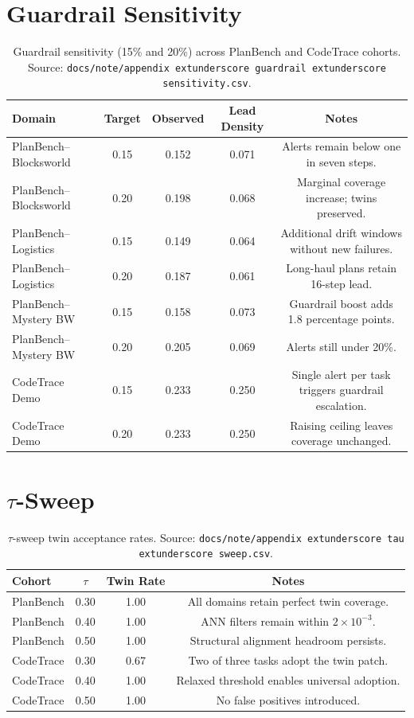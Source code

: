 \documentclass[11pt]{article}
\begin{document}
\section{Guardrail Sensitivity}
\label{app:guardrail}
\begin{table}[h]
  \centering
  \caption{Guardrail sensitivity (15\% and 20\%) across PlanBench and CodeTrace cohorts. Source: \texttt{docs/note/appendix	extunderscore guardrail	extunderscore sensitivity.csv}.}
  \begin{tabular}{lcccc}
    \toprule
    Domain & Target & Observed & Lead Density & Notes \\
    \midrule
    PlanBench--Blocksworld & 0.15 & 0.152 & 0.071 & Alerts remain below one in seven steps. \\
    PlanBench--Blocksworld & 0.20 & 0.198 & 0.068 & Marginal coverage increase; twins preserved. \\
    PlanBench--Logistics & 0.15 & 0.149 & 0.064 & Additional drift windows without new failures. \\
    PlanBench--Logistics & 0.20 & 0.187 & 0.061 & Long-haul plans retain 16-step lead. \\
    PlanBench--Mystery BW & 0.15 & 0.158 & 0.073 & Guardrail boost adds 1.8 percentage points. \\
    PlanBench--Mystery BW & 0.20 & 0.205 & 0.069 & Alerts still under 20\%. \\
    CodeTrace Demo & 0.15 & 0.233 & 0.250 & Single alert per task triggers guardrail escalation. \\
    CodeTrace Demo & 0.20 & 0.233 & 0.250 & Raising ceiling leaves coverage unchanged. \\
    \bottomrule
  \end{tabular}
\end{table}

\section{\texorpdfstring{$\tau$}{tau}-Sweep}
\label{app:tau}
\begin{table}[h]
  \centering
  \caption{$\tau$-sweep twin acceptance rates. Source: \texttt{docs/note/appendix	extunderscore tau	extunderscore sweep.csv}.}
  \begin{tabular}{lccc}
    \toprule
    Cohort & $\tau$ & Twin Rate & Notes \\
    \midrule
    PlanBench & 0.30 & 1.00 & All domains retain perfect twin coverage. \\
    PlanBench & 0.40 & 1.00 & ANN filters remain within $2\times10^{-3}$. \\
    PlanBench & 0.50 & 1.00 & Structural alignment headroom persists. \\
    CodeTrace & 0.30 & 0.67 & Two of three tasks adopt the twin patch. \\
    CodeTrace & 0.40 & 1.00 & Relaxed threshold enables universal adoption. \\
    CodeTrace & 0.50 & 1.00 & No false positives introduced. \\
    \bottomrule
  \end{tabular}
\end{table}
\end{document}
